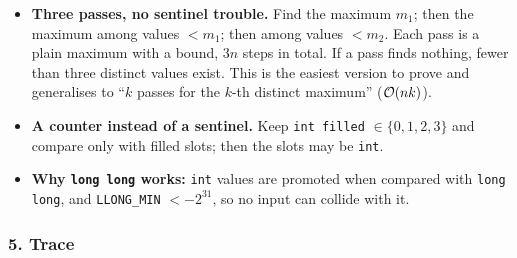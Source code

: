 \begin{tricksbox}
\begin{itemize}[leftmargin=*]
    \item \textbf{Three passes, no sentinel trouble.} Find the maximum $m_1$; then the maximum among values $< m_1$; then among values $< m_2$. Each pass is a plain maximum with a bound, $3n$ steps in total. If a pass finds nothing, fewer than three distinct values exist. This is the easiest version to prove and generalises to ``$k$ passes for the $k$-th distinct maximum'' ($\mathcal{O}(nk)$).
    \item \textbf{A counter instead of a sentinel.} Keep \texttt{int filled} $\in \{0,1,2,3\}$ and compare only with filled slots; then the slots may be \texttt{int}.
    \item \textbf{Why \texttt{long long} works:} \texttt{int} values are promoted when compared with \texttt{long long}, and \texttt{LLONG\_MIN} $< -2^{31}$, so no input can collide with it.
\end{itemize}
\end{tricksbox}

\subsubsection*{5. Trace}

